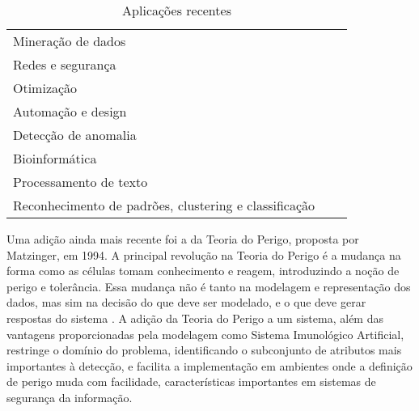 \vspace{0.5cm}
\begin{table}[h!]
    \centering
    \caption{Aplicações recentes \cite{Dasgupta2010}}
    \label{ais:applications}
    \begin{tabular}{l c r}
        \\
        \hline
        Mineração de dados                                    \\
        Redes e segurança                                     \\
        Otimização                                            \\
        Automação e design                                    \\
        Detecção de anomalia                                  \\
        Bioinformática                                        \\
        Processamento de texto                                \\
        Reconhecimento de padrões, clustering e classificação \\
        \hline
    \end{tabular}
\end{table}
\vspace{0.5cm}

Uma adição ainda mais recente foi a da Teoria do Perigo, proposta por Matzinger, em 1994. A principal revolução na Teoria do Perigo é a mudança na forma como as células tomam conhecimento e reagem, introduzindo a noção de perigo e tolerância. Essa mudança não é tanto na modelagem e representação dos dados, mas sim na decisão do que deve ser modelado, e o que deve gerar respostas do sistema \cite{Aickelin2005}. A adição da Teoria do Perigo a um sistema, além das vantagens proporcionadas pela modelagem como Sistema Imunológico Artificial, restringe o domínio do problema, identificando o subconjunto de atributos mais importantes à detecção, e facilita a implementação em ambientes onde a definição de perigo muda com facilidade, características importantes em sistemas de segurança da informação.

\iffalse

\section{Objetivos}
\section{Organização}

\fi
